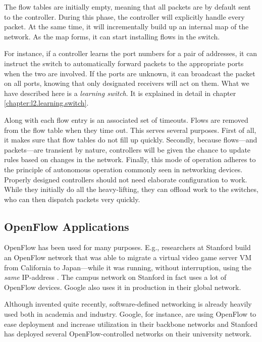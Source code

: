 The flow tables are initially empty, meaning that all packets are by default
sent to the controller.  During this phase, the controller will
explicitly handle every packet.  At the same time, it will incrementally
build up an internal map of the network.  As the map forms, it can start
installing flows in the switch.

For instance, if a controller learns the port numbers for a pair of
addresses, it can instruct the switch to automatically forward packets to
the appropriate ports when the two are involved.  If the ports are unknown,
it can broadcast the packet on all ports, knowing that only designated
receivers will act on them.
%
What we have described here is a \textit{learning switch}.  It is explained
in detail in chapter \vref{chapter:l2.learning.switch}.

Along with each flow entry is an associated set of timeouts.  Flows are
removed from the flow table when they time out.
%
This serves several purposes.  First of all, it makes sure that flow tables
do not fill up quickly.  Secondly, because flows---and packets---are
transient by nature, controllers will be given the chance to update rules
based on changes in the network.
%
Finally, this mode of operation adheres to the principle of autonomous
operation commonly seen in networking devices.
%
Properly designed controllers should not need elaborate configuration to
work.  While they initially do all the heavy-lifting, they can offload work
to the switches, who can then dispatch packets very quickly.

\subsection{OpenFlow Applications}

OpenFlow has been used for many purposes.  E.g., researchers at Stanford
build an OpenFlow network that was able to migrate a virtual video game
server \ac{VM} from California to Japan---while it was running, without
interruption, using the \textit{same} IP-address
\cite{erickson2008demonstration} \cite{kobayashi2013maturing}.
%
The campus network on Stanford in fact uses a lot of OpenFlow devices.
Google also uses it in production in their global network.

Although invented quite recently, software-defined networking is already
heavily used both in academia and industry.  Google, for instance, are using
OpenFlow to ease deployment and increase utilization in their backbone
networks \cite{crabbe2012sdn} and Stanford has deployed several
OpenFlow-controlled networks on their university network.

